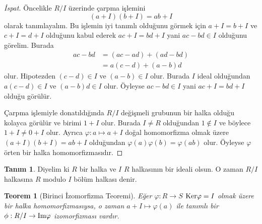 \documentclass{article}
\newtheorem{thm}{Teorem}[section]
\theoremstyle{definition}
\newtheorem{defn}{Tanım}[section]
\theoremstyle{remark}
\begin{document}
    	    \begin{proof}[İspat]
		        Öncelikle $R/I$ üzerinde çarpma işlemini
		        \begin{equation*}
		            (a + I)(b + I) = ab + I
		        \end{equation*}
		        olarak tanımlayalım. Bu işlemin iyi tanımlı olduğunu görmek için $a + I = b + I$ ve $c + I = d + I$ olduğunu kabul ederek $ac + I = bd + I$ yani $ac - bd \in I$ olduğunu görelim. Burada
		        \begin{align*}
		            ac - bd &= (ac - ad) + (ad - bd)\\
		            &= a(c - d) + (a - b)d
		        \end{align*}
		        olur. Hipotezden $(c - d) \in I$ ve $(a - b) \in I$ olur. Burada $I$ ideal olduğundan $a(c - d) \in I$ ve $(a - b)d \in I$ olur. Öyleyse $ac - bd \in I$ yani $ac + I = bd + I$ olduğu görülür.\par
		        Çarpma işlemiyle donatıldığında $R/I$ değişmeli grubunun bir halka olduğu kolayca görülür ve birimi $1 + I$ olur. Burada $I \neq R$ olduğundan $1 \notin I$ ve böylece $1 + I \neq 0 + I$ olur. Ayrıca $\varphi: a \mapsto a + I$ doğal homomorfizma olmak üzere $(a + I)(b + I) = ab + I$ olduğundan $\varphi(a) \varphi(b) = \varphi(ab)$ olur. Öyleyse $\varphi$ örten bir halka homomorfizmasıdır.
		    \end{proof}
    		
    		\begin{defn}
    		    Diyelim ki $R$ bir halka ve $I$ $R$ halkasının bir ideali olsun. O zaman $R/I$ halkasına $R$ modulo $I$ bölüm halkası denir.
    		\end{defn}
    		
    		\begin{thm}[Birinci İzomorfizma Teoremi]\label{2.4}
    		    Eğer $\varphi: R \to S$ $\textup{Ker}\varphi = I$ olmak üzere bir halka homomorfizmasıysa, o zaman $a + I \mapsto \varphi(a)$ ile tanımlı bir $\phi: R/I \to \textup{Im}\varphi$ izomorfizması vardır.
    		\end{thm}
    		
\end{document}
